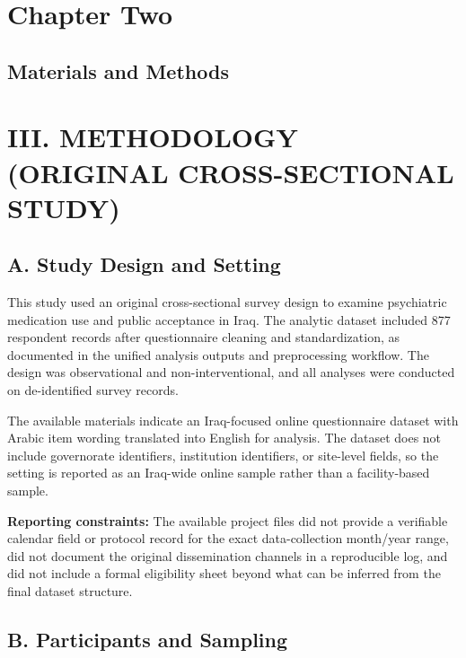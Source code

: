 \section{Chapter Two}\label{chapter-two}

\subsection{Materials and Methods}\label{materials-and-methods}

\section{III. METHODOLOGY (ORIGINAL CROSS-SECTIONAL
STUDY)}\label{iii.-methodology-original-cross-sectional-study}

\subsection{A. Study Design and
Setting}\label{a.-study-design-and-setting}

This study used an original cross-sectional survey design to examine
psychiatric medication use and public acceptance in Iraq. The analytic
dataset included 877 respondent records after questionnaire cleaning and
standardization, as documented in the unified analysis outputs and
preprocessing workflow. The design was observational and
non-interventional, and all analyses were conducted on de-identified
survey records.

The available materials indicate an Iraq-focused online questionnaire
dataset with Arabic item wording translated into English for analysis.
The dataset does not include governorate identifiers, institution
identifiers, or site-level fields, so the setting is reported as an
Iraq-wide online sample rather than a facility-based sample.

\textbf{Reporting constraints:} The available project files did not
provide a verifiable calendar field or protocol record for the exact
data-collection month/year range, did not document the original
dissemination channels in a reproducible log, and did not include a
formal eligibility sheet beyond what can be inferred from the final
dataset structure.

\subsection{B. Participants and
Sampling}\label{b.-participants-and-sampling}

